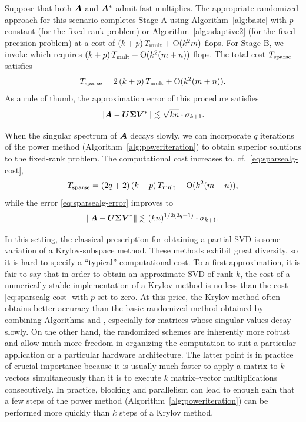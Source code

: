 \documentclass{article}
\begin{document}
Suppose that both $\bm{A}$ and $\bm{A}^*$ admit fast multiplies.
The appropriate randomized approach for this scenario completes
Stage A using Algorithm~\ref{alg:basic} with $p$ constant
(for the fixed-rank problem)
or Algorithm~\ref{alg:adaptive2} (for the fixed-precision problem)
at a cost of  $(k+p) \, T_{\rm mult} + \mathrm{O}(k^2 m)$ flops.
For Stage B, we invoke \cite[Algorithm~5.1]{RM} %
which
requires $(k+p) \, T_{\rm mult} + \mathrm{O}(k^2 (m + n))$ flops.
The total cost $T_{\rm sparse}$ satisfies
\begin{equation}
\label{eq:sparsealg-cost}
T_{\rm sparse} = 2\,(k + p)\, T_{\rm mult} + \mathrm{O}(k^2 (m + n)).
\end{equation}
As a rule of thumb, the approximation error of this procedure satisfies
\begin{equation}
\label{eq:sparsealg-error}
\left\Vert { \bm{A} - \bm{U\Sigma V}^*} \right\Vert \lesssim \sqrt{kn} \cdot \sigma_{k+1}.
\end{equation}


When the singular spectrum of $\bm{A}$ decays slowly,
we can incorporate $q$ iterations of the power method
(Algorithm~\ref{alg:poweriteration}) to obtain superior
solutions to the fixed-rank problem.
The computational cost increases to, cf.~\eqref{eq:sparsealg-cost},
\begin{equation}
\label{eq:sparsealg-cost2}
T_{\rm sparse} = (2q+2)\,(k + p) \, T_{\rm mult} + \mathrm{O}(k^2 (m + n)),
\end{equation}
while the error \eqref{eq:sparsealg-error} improves to
\begin{equation}
\label{eq:sparsealg-error2}
\left\Vert { \bm{A} - \bm{U\Sigma V}^*} \right\Vert \lesssim (kn)^{1/2(2q+1)} \cdot \sigma_{k+1}.
\end{equation}


In this setting, the classical prescription for obtaining a partial SVD
is some variation of a Krylov-subspace method.
These methods exhibit great diversity, so it is hard to specify
a ``typical'' computational cost.
To a first approximation, it is fair to say
that in order to obtain an approximate SVD of rank $k$, the cost of
a numerically stable implementation of a Krylov method is no less than
the cost \eqref{eq:sparsealg-cost} with $p$ set to zero. At this price,
the Krylov method often obtains better accuracy than the basic
randomized method obtained by combining Algorithms \cite[Algorithm~4.1]{RM} and
\cite[Algorithm~5.1]{RM}, especially for matrices whose singular values decay
slowly. On the other hand, the randomized schemes are inherently more robust
and allow much more freedom in organizing the computation to suit a particular
application or a particular hardware architecture. The latter point is in
practice of crucial importance because it is usually much faster to apply a
matrix to $k$ vectors simultaneously than it is to execute $k$ matrix--vector
multiplications consecutively.  In practice, blocking and parallelism can lead
to enough gain that a few steps of the power method (Algorithm~\ref{alg:poweriteration})
can be performed more quickly than $k$ steps of a Krylov method.
\end{document}
